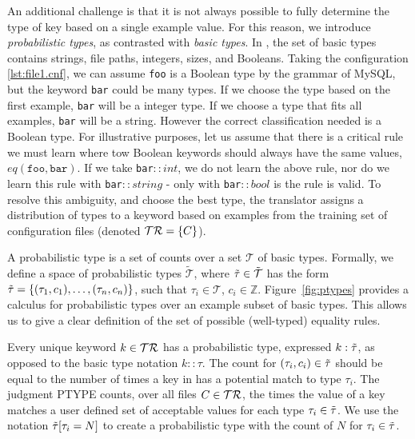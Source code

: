 An additional challenge is that it is not always possible to fully determine the type of key based on a single example value. 
For this reason, we introduce \textit{probabilistic types}, as contrasted with \textit{basic types}.
In \app, the set of basic types contains strings, file paths, integers, sizes, and Booleans. 
Taking the configuration \ref{lst:file1.cnf}, we can assume {\tt foo} is a Boolean type by the grammar of MySQL,
  but the keyword {\tt bar} could be many types.
If we choose the type based on the first example, {\tt bar} will be a integer type.
If we choose a type that fits all examples, {\tt bar} will be a string.
However the correct classification needed is a Boolean type.
For illustrative purposes, let us assume that there is a critical rule we must learn where tow Boolean keywords should always have the same values, \eg $eq(\texttt{foo},\texttt{bar})$.
If we take {\tt bar}$::int$, we do not learn the above rule, nor do we learn this rule with {\tt bar}$::string$ - only with {\tt bar}$::bool$ is the rule is valid.
To resolve this ambiguity, and choose the best type, the translator assigns a distribution of types to a keyword based on examples from the training set of configuration files (denoted $\mathcal{TR}=\{C\}$).
 

A probabilistic type is a set of counts over a set $\mathcal{T}$ of basic types.
Formally, we define a space of probabilistic types $\tilde{\mathcal{T}}$, where $\tilde{\tau} \in \tilde{\mathcal{T}}$ has the form $\tilde{\tau}=\{(\tau_1, c_1),\ldots,(\tau_n, c_n)\}$, such that $\tau_i \in \mathcal{T}$, $c_i \in \mathbb{Z}$. 
Figure~\ref{fig:ptypes} provides a calculus for probabilistic types over an example subset of basic types.
This allows us to give a clear definition of the set of possible (\ie well-typed) equality rules.

Every unique keyword $k \in \mathcal{TR}$ has a probabilistic type, expressed $k:\tilde{\tau}$, as opposed to the basic type notation $k::\tau$.
The count for $(\tau_i,c_i) \in \tilde{\tau}$ should be equal to the number of times a key in \trainingSet has a potential match to type $\tau_i$.
The judgment {\scriptsize PTYPE} counts, over all files $C \in \mathcal{TR}$, the times the value of a key matches a user defined set of acceptable values for each type $\tau_i \in \tilde{\tau}$.
We use the notation $\tilde{\tau}[\tau_i=N]$ to create a probabilistic type with the count of $N$ for $\tau_i \in \tilde{\tau}$.

